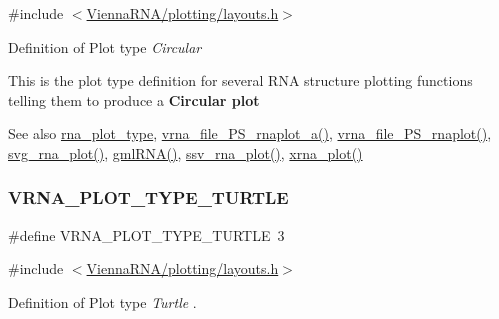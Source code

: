 {\ttfamily \#include $<$\mbox{\hyperlink{layouts_8h}{Vienna\+R\+N\+A/plotting/layouts.\+h}}$>$}



Definition of Plot type {\itshape Circular} 

This is the plot type definition for several R\+NA structure plotting functions telling them to produce a {\bfseries{Circular plot}}

\begin{DoxySeeAlso}{See also}
\mbox{\hyperlink{group__plotting__utils__deprecated_ga5964c4581431b098b80027d6e14dcdd4}{rna\+\_\+plot\+\_\+type}}, \mbox{\hyperlink{group__plotting__utils_ga139a31dd0ba9fc6612431f67de901c31}{vrna\+\_\+file\+\_\+\+P\+S\+\_\+rnaplot\+\_\+a()}}, \mbox{\hyperlink{group__plotting__utils_gabdc8f6548ba4a3bc3cd868ccbcfdb86a}{vrna\+\_\+file\+\_\+\+P\+S\+\_\+rnaplot()}}, \mbox{\hyperlink{group__plotting__utils_gae7853539b5df98f294b4af434e979304}{svg\+\_\+rna\+\_\+plot()}}, \mbox{\hyperlink{group__plotting__utils_ga70834bc8c0aad4fe6824ff76ccb8f329}{gml\+R\+N\+A()}}, \mbox{\hyperlink{group__plotting__utils_gadd368528755f9a830727b680243541df}{ssv\+\_\+rna\+\_\+plot()}}, \mbox{\hyperlink{group__plotting__utils_ga2f6d5953e6a323df898896b8d6614483}{xrna\+\_\+plot()}} 
\end{DoxySeeAlso}
\mbox{\label{group__plot__layout__utils_ga382c1c5c0b1943500aa4bb55b7658a33}} 
\subsubsection{\texorpdfstring{VRNA\_PLOT\_TYPE\_TURTLE}{VRNA\_PLOT\_TYPE\_TURTLE}}
{\footnotesize\ttfamily \#define V\+R\+N\+A\+\_\+\+P\+L\+O\+T\+\_\+\+T\+Y\+P\+E\+\_\+\+T\+U\+R\+T\+LE~3}



{\ttfamily \#include $<$\mbox{\hyperlink{layouts_8h}{Vienna\+R\+N\+A/plotting/layouts.\+h}}$>$}



Definition of Plot type {\itshape Turtle} \cite{wiegreffe:2018}. 

\mbox{\label{group__plot__layout__utils_ga64ec68055e241d11f659edb50f27ecae}} 
